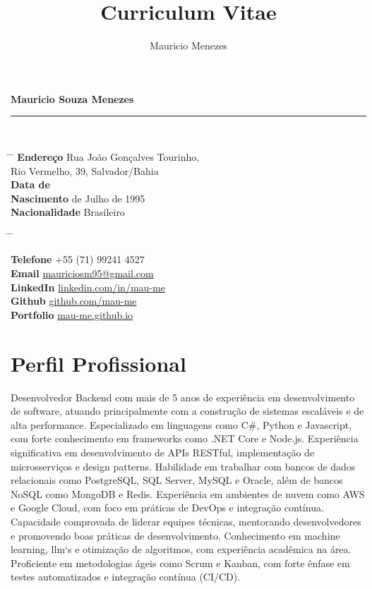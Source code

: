 \documentclass{article}
\title{Curriculum Vitae}
\author{Mauricio Menezes}
\begin{document}
{\huge{\color{slateblue}\textbf{Mauricio Souza Menezes}}} \\
\rule{\textwidth}{0.5mm} \\

\parbox{0.5\textwidth}{
	\begin{tabbing}
		\hspace{3cm} \= \hspace{4cm} \= \kill
		{\bf Endereço} \> Rua João Gonçalves Tourinho, \\
		\> Rio Vermelho, 39, Salvador/Bahia \\
		{\bf Data de } \\
		{\bf Nascimento}  de Julho de 1995 \\
		{\bf Nacionalidade} \> Brasileiro
	\end{tabbing}
}\hfil\parbox{0.5\textwidth}{
	\begin{tabbing}
		\hspace{3cm} \= \hspace{4cm} \= \kill

		{\bf Telefone}
		\> +55 (71) 99241 4527 \\

		{\bf Email} \>
		\href{mailto:mauriciosm95@gmail.com}{mauriciosm95@gmail.com} \\

		{\bf LinkedIn} \>
		\href{https://www.linkedin.com/in/mau-me/}{linkedin.com/in/mau-me} \\

		{\bf Github} \>
		\href{https://github.com/mau-me}{github.com/mau-me} \\

		{\bf Portfolio} \>
		\href{https://mau-me.github.io/}{mau-me.github.io} \\
	\end{tabbing}
}

\section*{Perfil Profissional}

Desenvolvedor Backend com mais de 5 anos de experiência em desenvolvimento de software, atuando principalmente com a construção de sistemas escaláveis e de alta performance. Especializado em linguagens como C\#, Python e Javascript, com forte conhecimento em frameworks como {.NET} Core e Node.js. Experiência significativa em desenvolvimento de APIs RESTful, implementação de microsserviços e design patterns. Habilidade em trabalhar com bancos de dados relacionais como PostgreSQL, SQL Server, MySQL e Oracle, além de bancos NoSQL como {MongoDB} e Redis. Experiência em ambientes de nuvem como AWS e Google Cloud, com foco em práticas de DevOps e integração contínua. Capacidade comprovada de liderar equipes técnicas, mentorando desenvolvedores e promovendo boas práticas de desenvolvimento. Conhecimento em machine learning, llm`s e otimização de algoritmos, com experiência acadêmica na área. Proficiente em metodologias ágeis como Scrum e Kanban, com forte ênfase em testes automatizados e integração contínua (CI/CD).
\end{document}
